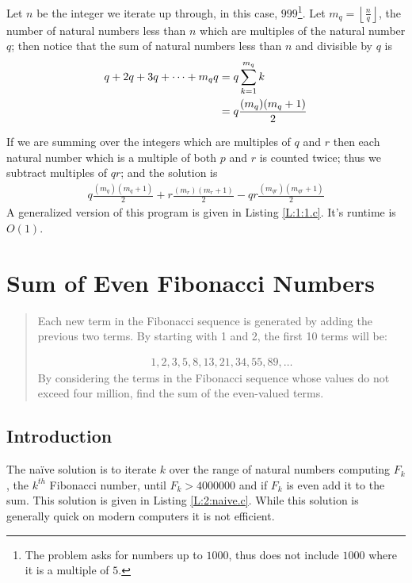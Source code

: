 \documentclass[oneside,12pt]{book}   	%
\newcounter{ex}
\newcounter{pr}
\theoremstyle{definition}
\newcommand{\floor}[1]{\left\lfloor #1 \right\rfloor}
\begin{document}
\begin{spacing}{1.618}
			Let $n$ be the integer we iterate up through, in this case, $999$\footnote{The problem asks for numbers up to $1000$, thus does not include $1000$ where it is a multiple of $5$.}. Let $m_q=\floor{\frac{n}{q}}$, the number of natural numbers less than $n$ which are multiples of the natural number $q$; then notice that the sum of natural numbers less than $n$ and divisible by $q$ is  
			\begin{alignat}{4}
				q+2q+3q+\dots+m_q q&=q\sum_{k=1}^{m_q}k \notag \\
					&=q\frac{(m_q)(m_q+1)}{2}
			\end{alignat}
			
			If we are summing over the integers which are multiples of $q$ and $r$ then each natural number which is a multiple of both $p$ and $r$ is counted twice; thus we subtract multiples of $qr$; and the solution is 
			\begin{alignat}{4}
				q\frac{(m_q)(m_q+1)}{2}+r\frac{(m_r)(m_r+1)}{2}-qr\frac{(m_{qr})(m_{qr}+1)}{2}
			\end{alignat}
			A generalized version of this program is given in Listing \ref{L:1:1.c}. It's runtime is $O(1)$. 
			
			 

	\chapter{Sum of Even Fibonacci Numbers}
		\begin{quote}
			Each new term in the Fibonacci sequence is generated by adding the previous two terms. By starting with 1 and 2, the first 10 terms will be:

			\begin{alignat*}{4}
				1, 2, 3, 5, 8, 13, 21, 34, 55, 89, \dots
			\end{alignat*}
			By considering the terms in the Fibonacci sequence whose values do not exceed four million, find the sum of the even-valued terms.
		\end{quote}

		\section{Introduction}
		
			The na\"ive solution is to iterate $k$ over the range of natural numbers computing $F_k$, the $k^{th}$ Fibonacci number, until $F_k>4000000$ and if $F_k$ is even add it to the sum. This solution is given in Listing \ref{L:2:naive.c}. While this solution is generally quick on modern computers it is not efficient. 
			

\end{spacing}
\end{document}
